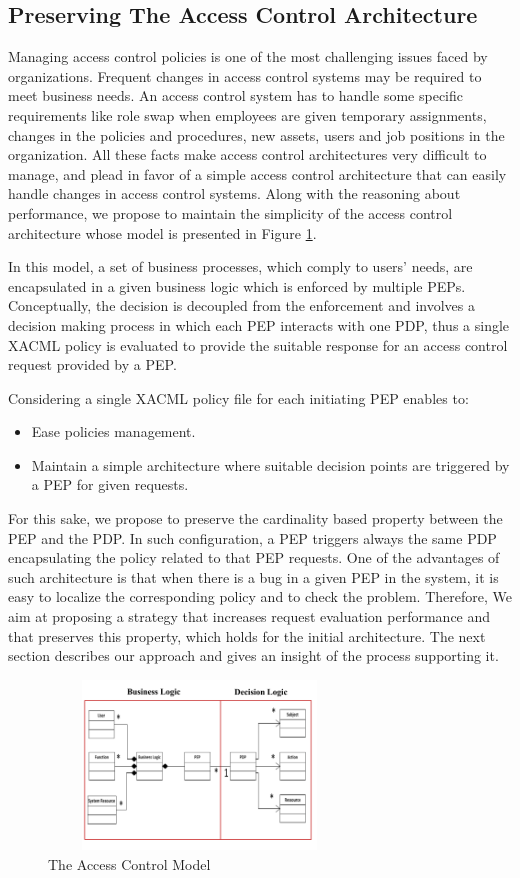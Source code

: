 \subsection{Preserving The Access Control Architecture}
Managing access control policies is one of the most challenging issues faced by organizations. 
Frequent changes in access control systems may be required to meet business needs. An access control system has to handle some specific 
requirements like role swap when employees are given temporary assignments, changes in the policies and procedures, 
new assets, users and job positions in the organization.
All these facts make access control architectures very difficult to manage, and plead in favor of a 
simple access control architecture that can easily handle changes in access control systems. 
Along with the reasoning about performance, we propose to maintain the simplicity of the access control architecture whose model 
is presented in Figure \ref{model}.

In this model, a set of business processes, which comply to users' needs, are encapsulated in a given business logic which is enforced 
by multiple PEPs. Conceptually, the decision is decoupled from the enforcement and involves a decision making process in which each PEP interacts 
with one PDP, thus a single XACML policy is evaluated to provide the suitable response for an access control request provided by a PEP. 

Considering a single XACML policy file for each initiating PEP enables to:
\begin{itemize}
 \item Ease policies management.
\item  Maintain a simple architecture where suitable decision points are triggered by a PEP for given requests.
\end{itemize}

For this sake, we propose to preserve the cardinality based property between the PEP and the PDP.
In such configuration, a PEP triggers always the same PDP encapsulating the policy related to that PEP requests. 
One of the advantages of such architecture is that when there is a bug in a given PEP in the system, it is 
easy to localize the corresponding policy and to check the problem. 
Therefore, We aim at proposing a strategy that increases request evaluation performance and that preserves this property, 
which holds for the initial architecture. The next section describes our approach and gives an insight of the process supporting it.


\begin{figure}[!h]
\begin{center}
\includegraphics[height=4.5cm,width=8cm]{model}
\caption{The Access Control Model}
\label{model}
\end{center}
\end{figure}
